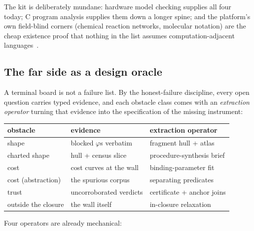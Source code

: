 The kit is deliberately mundane: hardware model checking supplies all
four today; C program analysis supplies them down a longer spine; and
the platform's own field-blind corners (chemical reaction networks,
molecular notation) are the cheap existence proof that nothing in the
list assumes computation-adjacent
languages~\citep{hurdygurdy2026calculus}.

\subsection{The far side as a design oracle}
\label{sec:kit-oracle}

A terminal board is not a failure list. By the honest-failure
discipline, every open question carries typed evidence, and each
obstacle class comes with an \emph{extraction operator} turning that
evidence into the specification of the missing instrument:

\begin{center}
\footnotesize
\setlength{\tabcolsep}{3pt}
\begin{tabular}{@{}lll@{}}
\toprule
obstacle & evidence & extraction operator \\
\midrule
shape & blocked $\varphi$s verbatim & fragment hull + atlas \\
charted shape & hull + census slice & procedure-synthesis brief \\
cost & cost curves at the wall & binding-parameter fit \\
cost (abstraction) & the spurious corpus & separating predicates \\
trust & uncorroborated verdicts & certificate + anchor joins \\
outside the closure & the wall itself & in-closure relaxation \\
\bottomrule
\end{tabular}
\end{center}

Four operators are already mechanical:

